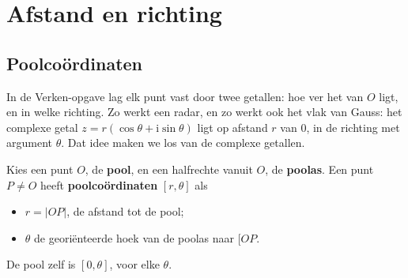 \begin{oefeningen}[Start]

\end{oefeningen}


\section{Afstand en richting}

\subsection{Poolcoördinaten}

In de Verken-opgave lag elk punt vast door twee getallen: hoe ver het van $O$ ligt, en in welke richting. Zo werkt een radar, en zo werkt ook het vlak van Gauss: het complexe getal $z = r(\cos\theta + \mathrm{i}\sin\theta)$ ligt op afstand $r$ van 0, in de richting met argument $\theta$. Dat idee maken we los van de complexe getallen.

\begin{theorie}
\begin{minipage}[t]{.64\linewidth}
\vspace{0pt}
Kies een punt $O$, de \textbf{\textcolor{accent}{pool}}, en een halfrechte vanuit $O$, de \textbf{\textcolor{accent}{poolas}}. Een punt $P \neq O$ heeft \textbf{\textcolor{accent}{poolcoördinaten}} $[r, \theta]$ als
\begin{itemize}
\item $r = |OP|$, de afstand tot de pool;
\item $\theta$ de georiënteerde hoek van de poolas naar $[OP$.
\end{itemize}
De pool zelf is $[0, \theta]$, voor elke $\theta$.
\end{minipage}\hfill
\begin{minipage}[t]{.32\linewidth}
\vspace{1mm}
\centering
{}
\end{minipage}
\end{theorie}

